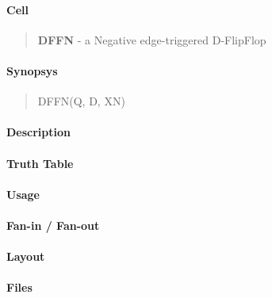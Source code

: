 \label{DFFN}
\paragraph{Cell}
\begin{quote}
    \textbf{DFFN} - a Negative edge-triggered D-FlipFlop
\end{quote}

\paragraph{Synopsys}
\begin{quote}
    DFFN(Q, D, XN)
\end{quote}

\paragraph{Description}

%

\paragraph{Truth Table}
%

\paragraph{Usage}

\paragraph{Fan-in / Fan-out}

\paragraph{Layout}

\paragraph{Files}

\clearpage
